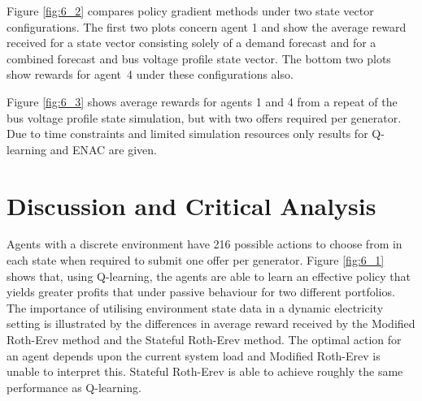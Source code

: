 Figure \ref{fig:6_2} compares policy gradient methods under two state vector
configurations.  The first two plots concern agent 1 and show the average
reward received for a state vector consisting solely of a demand forecast and
for a combined forecast and bus voltage profile state vector.  The bottom two
plots show rewards for agent~4 under these configurations also.


Figure \ref{fig:6_3} shows average rewards for agents 1 and 4 from a repeat of
the bus voltage profile state simulation, but with two offers required per
generator.  Due to time constraints and limited simulation resources only
results for Q-learning and ENAC are given.

\section{Discussion and Critical Analysis}
\label{sec:discuss}
Agents with a discrete environment have 216 possible actions to choose from in each state
when required to submit one offer per generator.  Figure \ref{fig:6_1} shows
that, using Q-learning, the agents are able to learn an effective policy that
yields greater profits that under passive behaviour for two different
portfolios.  The importance of utilising environment state data in a dynamic
electricity setting is illustrated by the differences in average reward received
by the Modified Roth-Erev method and the Stateful Roth-Erev method.  The optimal
action for an agent depends upon the current system load and Modified Roth-Erev
is unable to interpret this.  Stateful Roth-Erev is able to achieve roughly the
same performance as Q-learning.

